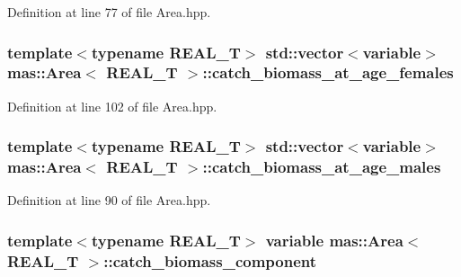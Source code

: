 Definition at line 77 of file Area.\-hpp.

\hypertarget{structmas_1_1_area_a77be076c07976d8b8ca1f94e9f9bc00a}{
\subsubsection[{catch\-\_\-biomass\-\_\-at\-\_\-age\-\_\-females}]{\setlength{\rightskip}{0pt plus 5cm}template$<$typename R\-E\-A\-L\-\_\-\-T$>$ std\-::vector$<${\bf variable}$>$ {\bf mas\-::\-Area}$<$ R\-E\-A\-L\-\_\-\-T $>$\-::catch\-\_\-biomass\-\_\-at\-\_\-age\-\_\-females}}\label{structmas_1_1_area_a77be076c07976d8b8ca1f94e9f9bc00a}


Definition at line 102 of file Area.\-hpp.

\hypertarget{structmas_1_1_area_a029e7f2d0fccc9acf8e2d5767644d1fa}{
\subsubsection[{catch\-\_\-biomass\-\_\-at\-\_\-age\-\_\-males}]{\setlength{\rightskip}{0pt plus 5cm}template$<$typename R\-E\-A\-L\-\_\-\-T$>$ std\-::vector$<${\bf variable}$>$ {\bf mas\-::\-Area}$<$ R\-E\-A\-L\-\_\-\-T $>$\-::catch\-\_\-biomass\-\_\-at\-\_\-age\-\_\-males}}\label{structmas_1_1_area_a029e7f2d0fccc9acf8e2d5767644d1fa}


Definition at line 90 of file Area.\-hpp.

\hypertarget{structmas_1_1_area_ac0c9427ab19559cd60bbf26c1ac75c63}{
\subsubsection[{catch\-\_\-biomass\-\_\-component}]{\setlength{\rightskip}{0pt plus 5cm}template$<$typename R\-E\-A\-L\-\_\-\-T$>$ {\bf variable} {\bf mas\-::\-Area}$<$ R\-E\-A\-L\-\_\-\-T $>$\-::catch\-\_\-biomass\-\_\-component}}\label{structmas_1_1_area_ac0c9427ab19559cd60bbf26c1ac75c63}


